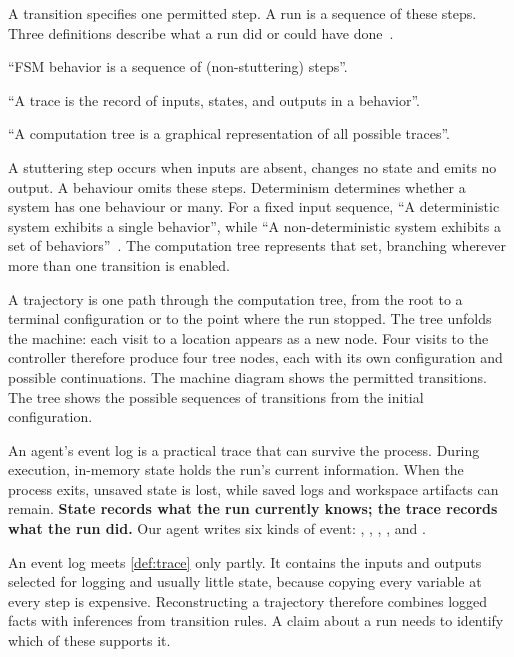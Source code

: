 A transition specifies one permitted step. A run is a sequence of these steps. Three definitions
describe what a run did or could have done~\citep[slide~8]{seshia2015extended}.

\begin{definition}[Behaviour]
\label{def:behaviour}
``FSM behavior is a sequence of (non-stuttering) steps''.
\end{definition}

\begin{definition}[Trace]
\label{def:trace}
``A trace is the record of inputs, states, and outputs in a behavior''.
\end{definition}

\begin{definition}
\label{def:computation-tree}
``A computation tree is a graphical representation of all possible traces''.
\end{definition}

A stuttering step occurs when inputs are absent, changes no state and emits no output. A behaviour
omits these steps. Determinism determines whether a system has one behaviour or many. For a fixed
input sequence, ``A deterministic system exhibits a single
behavior'', while ``A non-deterministic system exhibits a set of
behaviors''~\citep[slides~29 and~36]{seshia2015discrete}. The computation tree represents that set,
branching wherever more than one transition is enabled.

A trajectory is one path through the computation tree, from the root to a terminal configuration
or to the point where the run stopped. The tree unfolds the machine: each visit to a location
appears as a new node. Four visits to the controller therefore produce four tree nodes, each with
its own configuration and possible continuations. The machine diagram shows the permitted
transitions. The tree shows the possible sequences of transitions from the initial configuration.

An agent's event log is a practical trace that can survive the process. During execution,
in-memory state holds the run's current information. When the process exits, unsaved state is
lost, while saved logs and workspace artifacts can remain. \textbf{State records what the run currently knows; the trace
records what the run did.} Our agent writes six kinds of event:
, , , ,
 and .

An event log meets \cref{def:trace} only partly. It contains the inputs and outputs selected for
logging and usually little state, because copying every variable at every step is expensive.
Reconstructing a trajectory therefore combines logged facts with inferences from transition
rules. A claim about a run needs to identify which of these supports it.

